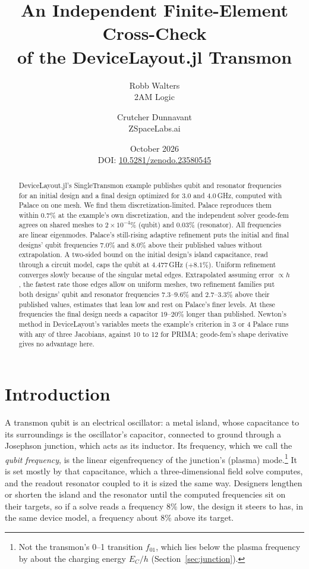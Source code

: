 \documentclass{anvil-paper}
\title{An Independent Finite-Element Cross-Check\\of the DeviceLayout.jl Transmon}
\author{Robb Walters\\
  {\normalsize 2AM Logic}
  \and Crutcher Dunnavant\\
  {\normalsize ZSpaceLabs.ai}}
\date{October 2026\\[0.5ex]
  {\normalsize DOI: \href{https://doi.org/10.5281/zenodo.23580545}{10.5281/zenodo.23580545}}}
\begin{document}
\maketitle

\begin{abstract}
DeviceLayout.jl's SingleTransmon example publishes qubit and resonator
frequencies for an initial design and a final design optimized for $3.0$
and $4.0$\,GHz, computed with Palace on one mesh. We find them
discretization-limited. Palace reproduces them within $0.7\%$ at the
example's own discretization, and the independent solver geode-fem agrees
on shared meshes to $2\times10^{-4}\%$ (qubit) and $0.03\%$
(resonator). All frequencies are linear eigenmodes. Palace's
still-rising adaptive refinement puts the initial and final designs' qubit
frequencies $7.0\%$ and $8.0\%$ above their published values without
extrapolation. A two-sided bound on the initial design's island
capacitance, read through a circuit model, caps the qubit at
$4.477$\,GHz ($+8.1\%$). Uniform refinement converges slowly because of
the singular metal edges. Extrapolated assuming error $\propto h$, the
fastest rate those edges allow on uniform meshes, two refinement families put both
designs' qubit and resonator frequencies $7.3$--$9.6\%$ and
$2.7$--$3.3\%$ above their published values, estimates that lean low and
rest on Palace's finer levels. At these frequencies the final design needs
a capacitor $19$--$20\%$ longer than published. Newton's method in
DeviceLayout's variables meets the example's criterion in 3 or 4 Palace
runs with any of three Jacobians, against 10 to 12 for PRIMA; geode-fem's
shape derivative gives no advantage here.
\end{abstract}

\section{Introduction}
\label{sec:intro}

A transmon qubit is an electrical oscillator: a metal island, whose
capacitance to its surroundings is the oscillator's capacitor, connected
to ground through a Josephson junction, which acts as its inductor. Its
frequency, which we call the \emph{qubit frequency}, is the linear
eigenfrequency of the junction's (plasma) mode.\footnote{Not the
transmon's 0--1 transition $f_{01}$, which lies below the plasma frequency
by about the charging energy $E_C/h$ (Section~\ref{sec:junction}).} It is
set mostly by that capacitance, which a three-dimensional field solve
computes, and the readout resonator coupled to it is sized the same way. Designers lengthen or shorten the island and the resonator until
the computed frequencies sit on their targets, so if a solve reads a
frequency $8\%$ low, the design it steers to has, in the same device
model, a frequency about $8\%$ above its target.
\end{document}
